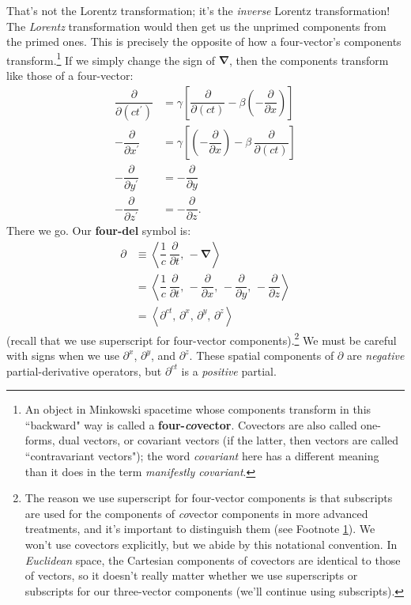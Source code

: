 \documentclass[12pt]{article}
\newcommand{\del}{\boldsymbol{\nabla}}
\begin{document}
That's not the Lorentz transformation; it's the \emph{inverse} Lorentz transformation! The \emph{Lorentz} transformation would then get us the unprimed components from the primed ones. This is precisely the opposite of how a four-vector's components transform.\footnote{\label{fn:cv}An object in Minkowski spacetime whose components transform in this ``backward" way is called a \textbf{four-\emph{co}vector}. Covectors are also called one-forms, dual vectors, or covariant vectors (if the latter, then vectors are called ``contravariant vectors"); the word \emph{covariant} here has a different meaning than it does in the term \emph{manifestly covariant}.} If we simply change the sign of $\del$, then the components transform like those of a four-vector:
\begin{equation*}
\begin{split}
\dfrac{\partial}{\partial (ct^\prime)} &= \gamma \left[ \dfrac{\partial}{\partial (ct)} - \beta \left(- \dfrac{\partial}{\partial x} \right) \right] \\[3pt]
- \dfrac{\partial}{\partial x^\prime} &= \gamma \left[ \left( - \dfrac{\partial}{\partial x} \right) - \beta \, \dfrac{\partial}{\partial (ct)}  \right] \\[3pt]
- \dfrac{\partial}{\partial y^\prime} &= - \dfrac{\partial}{\partial y} \\[3pt]
- \dfrac{\partial}{\partial z^\prime} &= - \dfrac{\partial}{\partial z} .
\end{split}
\end{equation*}
There we go. Our \textbf{four-del} symbol is:
\begin{equation}\label{eq:fn}
\boxed{
\begin{aligned}
\partialup &\equiv \left \langle \dfrac{1}{c} \, \dfrac{\partial}{\partial t} , \, - \del \right \rangle \\[3pt]
&= \left \langle \dfrac{1}{c} \, \dfrac{\partial}{\partial t} , \, - \dfrac{\partial}{\partial x}, \, - \dfrac{\partial}{\partial y}, \, - \dfrac{\partial}{\partial z} \right \rangle \\[3pt]
&=  \left \langle \partial^{ct}, \, \partial^x , \, \partial^y , \, \partial^z \right \rangle
\end{aligned}
}
\end{equation}
(recall that we use superscript for four-vector components).\footnote{The reason we use superscript for four-vector components is that subscripts are used for the components of \emph{co}vector components in more advanced treatments, and it's important to distinguish them (see Footnote \ref{fn:cv}). We won't use covectors explicitly, but we abide by this notational convention. In \emph{Euclidean} space, the Cartesian components of covectors are identical to those of vectors, so it doesn't really matter whether we use superscripts or subscripts for our three-vector components (we'll continue using subscripts).} We must be careful with signs when we use $\partial^x$, $\partial^y$, and $\partial^z$. These spatial components of $\partialup$ are \emph{negative} partial-derivative operators, but $\partial^{ct}$ is a \emph{positive} partial.
\end{document}
